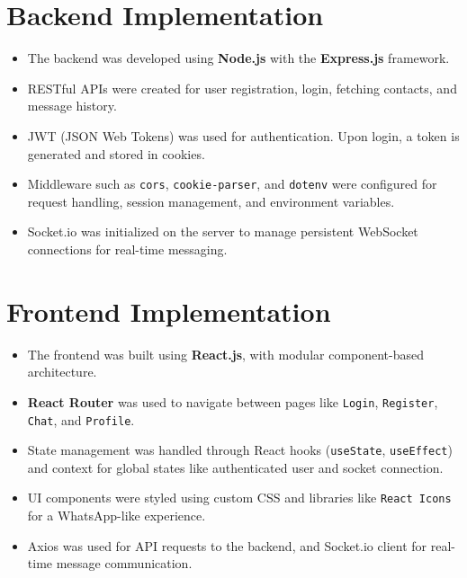 \documentclass[12pt,a4paper]{report}
\begin{document}
\section{Backend Implementation}
\begin{itemize}
    \item The backend was developed using \textbf{Node.js} with the \textbf{Express.js} framework.
    \item RESTful APIs were created for user registration, login, fetching contacts, and message history.
    \item JWT (JSON Web Tokens) was used for authentication. Upon login, a token is generated and stored in cookies.
    \item Middleware such as \texttt{cors}, \texttt{cookie-parser}, and \texttt{dotenv} were configured for request handling, session management, and environment variables.
    \item Socket.io was initialized on the server to manage persistent WebSocket connections for real-time messaging.
\end{itemize}

\section{Frontend Implementation}
\begin{itemize}
    \item The frontend was built using \textbf{React.js}, with modular component-based architecture.
    \item \textbf{React Router} was used to navigate between pages like \texttt{Login}, \texttt{Register}, \texttt{Chat}, and \texttt{Profile}.
    \item State management was handled through React hooks (\texttt{useState}, \texttt{useEffect}) and context for global states like authenticated user and socket connection.
    \item UI components were styled using custom CSS and libraries like \texttt{React Icons} for a WhatsApp-like experience.
    \item Axios was used for API requests to the backend, and Socket.io client for real-time message communication.
\end{itemize}
\end{document}
